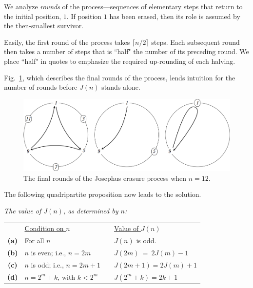 \begin{itemize}
\medskip

We analyze \textit{rounds} of the process---sequences of elementary steps that return to the initial position, $1$.  If position $1$ has been erased, then its role is assumed by the then-smallest survivor.

\smallskip

Easily, the first round of the process takes $\lceil n/2 \rceil$ steps.  Each subsequent round then takes a number of steps that is ``half" the number of its preceding round.  We place ``half" in quotes to emphasize the required up-rounding of each halving.  

\medskip

Fig.~\ref{fig:josephus12step2}, which describes the final rounds of the process, lends intuition for the number of rounds before $J(n)$ stands alone.
\begin{figure}[ht]
\begin{center}
        \includegraphics[scale=0.25]{FiguresMaths/josephus12LastSteps}
        \caption{The final rounds of the Josephus erasure process when $n=12$.}
        \label{fig:josephus12step2}
\end{center}
\end{figure}

\medskip

The following quadripartite proposition now leads to the solution.

{\em 
The value of $J(n)$, as determined by $n$:

\begin{tabular}{clll}
 & \underline{Condition on $n$} & \hspace*{.1in} & \underline{Value of $J(n)$} \\ 
{\bf (a)} &
For all $n$ &  & $J(n)$ is odd. \\
{\bf (b)} &
$n$ is even; i.e., $n = 2m$ & & $J(2m) \ = \ 2J(m)-1$ \\
{\bf (c)} &
$n$ is odd; i.e., $n = 2m+1$ & & $J(2m+1) = 2J(m)+1$ \\
{\bf (d)} &
$n = 2^m+k$, with $k < 2^m$ & & $J(2^m+k) = 2k+1$
\end{tabular}
}


\end{itemize}
